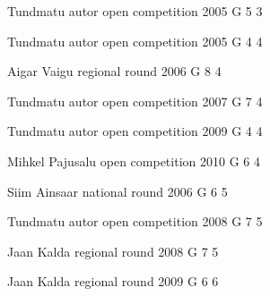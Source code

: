 \documentclass[11pt]{article}
\begin{document}
\ylDisplay{} %
{Tundmatu autor} %
{open competition} %
{2005} %
{G 5} %
{3} %
{

\ifEngSolution
\fi
}

\ylDisplay{} %
{Tundmatu autor} %
{open competition} %
{2005} %
{G 4} %
{4} %
{

\ifEngSolution
\fi
}

\ylDisplay{} %
{Aigar Vaigu} %
{regional round} %
{2006} %
{G 8} %
{4} %
{

\ifEngSolution
\fi
}

\ylDisplay{} %
{Tundmatu autor} %
{open competition} %
{2007} %
{G 7} %
{4} %
{

\ifEngSolution
\fi
}

\ylDisplay{} %
{Tundmatu autor} %
{open competition} %
{2009} %
{G 4} %
{4} %
{

\ifEngSolution
\fi
}

\ylDisplay{} %
{Mihkel Pajusalu} %
{open competition} %
{2010} %
{G 6} %
{4} %
{

\ifEngSolution
\fi
}

\ylDisplay{} %
{Siim Ainsaar} %
{national round} %
{2006} %
{G 6} %
{5} %
{

\ifEngSolution
\fi
}

\ylDisplay{} %
{Tundmatu autor} %
{open competition} %
{2008} %
{G 7} %
{5} %
{

\ifEngSolution
\fi
}

\ylDisplay{} %
{Jaan Kalda} %
{regional round} %
{2008} %
{G 7} %
{5} %
{

\ifEngSolution
\fi
}

\ylDisplay{} %
{Jaan Kalda} %
{regional round} %
{2009} %
{G 6} %
{6} %
{

\ifEngSolution
\fi
}
\end{document}

